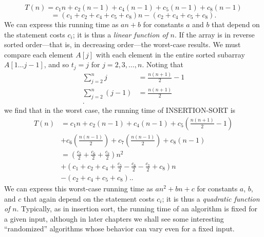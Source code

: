 \documentclass{report}
\begin{document}
    \[
        T(n) = c_1 n + c_2 (n - 1) + c_4 (n - 1) + c_5 (n - 1) + c_8 (n - 1)
    \]
    \[
        = (c_1 + c_2 + c_4 + c_5 + c_8)n - (c_2 + c_4 + c_5 + c_8).
    \]
    We can express this running time as \( an + b \) for constants \( a \) and \( b \) that depend on the statement costs \( c_i \); it is thus a \textit{linear function of} \( n \).
    \bigbreak \noindent 
    If the array is in reverse sorted order—that is, in decreasing order—the worst-case results. We must compare each element \( A[j] \) with each element in the entire sorted subarray \( A[1 \ldots j - 1] \), and so \( t_j = j \) for \( j = 2, 3, \ldots, n \). Noting that
    \begin{align*}
        \sum_{j=2}^{n}j &= \frac{n(n+1)}{2}-1 \\
        \sum_{j=2}^{n}(j-1) &= \frac{n(n+1)}{2} \\
    .\end{align*}
    \bigbreak \noindent 
    we find that in the worst case, the running time of INSERTION-SORT is
    \begin{align*}
        T(n) &= c_1 n + c_2 (n - 1) + c_4 (n - 1) + c_5 \left( \frac{n(n + 1)}{2} - 1 \right) \\
             &+ c_6 \left( \frac{n(n - 1)}{2} \right) + c_7 \left( \frac{n(n - 1)}{2} \right) + c_8 (n - 1) \\
             &= \left( \frac{c_5}{2} + \frac{c_6}{2} + \frac{c_7}{2} \right) n^2  \\
             &+ \left( c_1 + c_2 + c_4 + \frac{c_5}{2} - \frac{c_6}{2} - \frac{c_7}{2} + c_8 \right) n \\
             &- \left( c_2 + c_4 + c_5 + c_8 \right). 
    .\end{align*}
    We can express this worst-case running time as \( an^2 + bn + c \) for constants \( a \), \( b \), and \( c \) that again depend on the statement costs \( c_i \); it is thus a \textit{quadratic function of} \( n \).
    \bigbreak \noindent 
    Typically, as in insertion sort, the running time of an algorithm is fixed for a given input, although in later chapters we shall see some interesting ``randomized'' algorithms whose behavior can vary even for a fixed input.
    \bigbreak \noindent 
\end{document}
